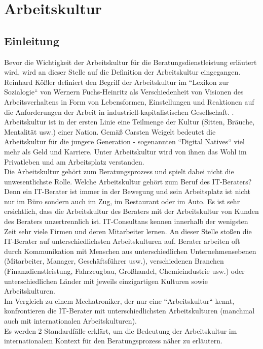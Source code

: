 \section{Arbeitskultur}
	\subsection{Einleitung}
Bevor die Wichtigkeit der Arbeitskultur für die Beratungsdienstleistung erläutert wird, wird an dieser Stelle auf die Definition der Arbeitskultur eingegangen. Reinhard Kößler definiert den Begriff der Arbeitskultur im ``Lexikon zur Sozialogie`` von Wernern Fuchs-Heinritz als Verschiedenheit von Visionen des Arbeitsverhaltens in Form von Lebensformen, Einstellungen und Reaktionen auf die Anforderungen der Arbeit in industriell-kapitalistischen Gesellschaft. \cite{Fuchs-HeinritzLautmannRammstedtWienold1994}.
Arbeitskultur ist in der ersten Linie eine Teilmenge der Kultur (Sitten, Bräuche, Mentalität usw.) einer Nation. Gemäß Carsten Weigelt bedeutet die Arbeitskultur für die jungere Generation - sogenannten ``Digital Natives`` viel mehr als Geld und Karriere. Unter Arbeitskultur wird von ihnen das Wohl im Privatleben und am Arbeitsplatz verstanden.\\ Die Arbeitskultur gehört zum Beratungsprozess und spielt dabei nicht die unwesentlichste Rolle. Welche Arbeitskultur gehört zum Beruf des IT-Beraters? Denn ein IT-Berater ist immer in der Bewegung und sein Arbeitsplatz ist nicht nur im Büro sondern auch im Zug, im Restaurant oder im Auto. Es ist sehr ersichtlich, dass die Arbeitskultur des Beraters mit der Arbeitskultur von Kunden des Beraters unzertrennlich ist. IT-Consultans kennen innerhalb der wenigsten Zeit sehr viele Firmen und deren Mitarbeiter lernen. An dieser Stelle stoßen die IT-Berater auf unterschiedlichsten Arbeitskulturen auf. Berater arbeiten oft durch Kommunikation mit Menschen aus unterschiedlichen Unternehmensebenen (Mitarbeiter, Manager, Geschäftsführer usw.), verschiedenen Branchen (Finanzdienstleistung, Fahrzeugbau, Großhandel, Chemieindustrie usw.) oder unterschiedlichen Länder mit jeweils einzigartigen Kulturen sowie Arbeitskulturen.\\
Im Vergleich zu einem Mechatroniker, der nur eine ``Arbeitskultur`` kennt, konfrontieren die IT-Berater mit unterschiedlichsten Arbeitskulturen (manchmal auch mit internationalen Arbeitskulturen).\\
Es werden 2 Standardfälle erklärt, um die Bedeutung der Arbeitskultur im internationalem Kontext für den Beratungsprozess näher zu erläutern.\\

